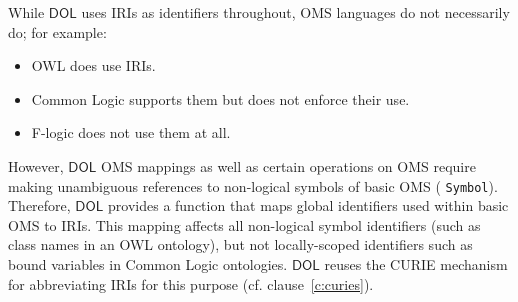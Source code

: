 \documentclass[10pt,fleqn,final]{scrreprt}
\makeatletter
\newcommand*{\cf}{cf.\@\xspace}
\newcommand*\CommentAuthor{}
\renewcommand*\CommentAuthor{#1}}
\newcommand*\CommentDate{}
\renewcommand*\CommentDate{#1}}
\newcommand*\CommentId{}
\renewcommand*\CommentId{#1}}
\newcommand*\CommentType{}
\renewcommand*\CommentType{#1}}
\newcommand*{\SetCommentColorByType}[1]{%
\edef\localType{{#1}}%
\expandafter\ifstrequal\localType{q-aut}{\colorlet{CommentColor}{red}}{%
\expandafter\ifstrequal\localType{q-all}{\colorlet{CommentColor}{orange}}{%
\expandafter\ifstrequal\localType{todo}{\colorlet{CommentColor}{orange}}{%
\expandafter\ifstrequal\localType{fyi}{\colorlet{CommentColor}{lightgray}}{%
\colorlet{CommentColor}{yellow}}}}}}
\newcommand*{\SetCommentPrefixByType}[1]{%
\edef\localType{{#1}}%
\expandafter\@ifmtarg\localType{%
\edef\CommentPrefix{}%
}{%
\caseupper[q]{#1}%
\edef\CommentPrefix{\thestring: }%
}}
\newcommand*{\initComment}[1]{%
\setkeys{Comment}{#1}%
\SetCommentColorByType{\CommentType}%
\relax%
\SetCommentPrefixByType{\CommentType}%
\relax%
}
\newcommand*{\todonote}[2][]{%
\initComment{#1}%
\pdfcomment[author=\CommentAuthor,color=CommentColor,date=\CommentDate,id=\CommentId]{%
\CommentPrefix
#2}}
\renewcommand*{\todonote}[2][]{%
\initComment{#1}%
\ednote{\CommentPrefix #2}}
\newcommand*{\CLnote}[2][author=Christoph Lange]{%
\todonote[author=Christoph Lange,#1]{#2} 
}
\newcommand*{\syntax}[1]{\texttt{#1}}
\newcommand*{\DOL}{\ensuremath{\mathsf{DOL}}\xspace}
\newcommand{\clauserefname}{clause}
\newcommand{\noterefname}{note}
\newcommand{\cref}[1]{\clauserefname~\ref{#1}}
\newcommand{\nref}[1]{\noterefname~\ref{#1}}
\renewcommand{\nref}[1]{\ref{nref-#1}} %
\newenvironment{definitions}[0]{\medskip }{}
\providecommand{\DIFadd}[1]{{\protect\color{blue}\uwave{#1}}} %
\providecommand{\DIFaddbegin}{} %
\providecommand{\DIFaddend}{} %
\providecommand{\DIFdelbegin}{} %
\providecommand{\DIFdelend}{} %
\makeatother
\begin{document}
\begin{definitions}
While \DOL uses IRIs as identifiers throughout, OMS languages do not necessarily do; for example:
\begin{itemize}
\item OWL \DIFdelbegin %
\DIFdelend \DIFaddbegin \DIFadd{\nref{OWL2}, Section 5.5 }\DIFaddend does use IRIs.
\item Common Logic \DIFdelbegin %
\DIFdelend \DIFaddbegin \DIFadd{\nref{CL} }\DIFaddend supports them but does not enforce their use.
\item F-logic \cite{flogic} does not use them at all.
\end{itemize}
However, \DOL OMS mappings as well as 
certain operations on OMS require making unambiguous references to non-logical symbols of basic OMS (\DIFdelbegin %
\DIFdelend \DIFaddbegin \syntax{Symbol}\DIFaddend ).  Therefore, \DOL provides a function that maps global identifiers used within basic OMS to IRIs.  This mapping affects all non-logical symbol identifiers (such as class names in an OWL ontology), but not locally-scoped identifiers such as bound variables in Common Logic ontologies.  \DOL reuses the CURIE mechanism for abbreviating IRIs for this purpose (\cf \cref{c:curies}).


\end{definitions}
\end{document}
